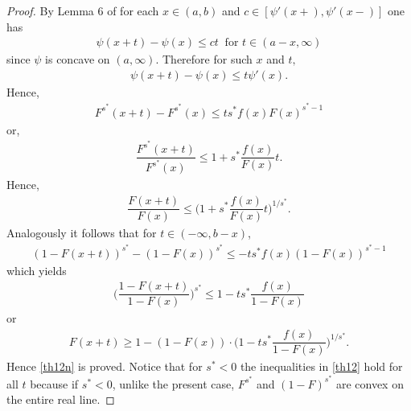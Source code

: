 \documentclass[11pt]{amsart}
\numberwithin{equation}{section}
\def\st{\ensuremath{s^*}}
\theoremstyle{definition}\newtheorem{definition}{Definition}
\theoremstyle{remark}\newtheorem{assumption}{Assumption}
\theoremstyle{remark}\newtheorem{remark}{Remark}
\theoremstyle{definition}\newtheorem{example}{Example}
\theoremstyle{plain}\newtheorem{question}{Question}
\theoremstyle{plain}\newtheorem{theorem}{Theorem}
\theoremstyle{plain}\newtheorem{lemma}{Lemma}
\theoremstyle{plain}\newtheorem{proposition}{Proposition}
\theoremstyle{plain}\newtheorem{corollary}{Corollary}
\theoremstyle{plain}\newtheorem{conjecture}{Conjecture}
\begin{document}
\begin{proof}
By Lemma 6 of \cite{DuembgenKW:2017} for each $x\in(a,b)$ and $c\in[\psi'(x+),\psi'(x-)]$ one has
 \begin{eqnarray*}
    \psi(x+t) -\psi(x)\leq ct\ \text{ for }t\in(a-x,\infty)
 \end{eqnarray*}
 since $\psi$ is concave on $(a,\infty).$
    Therefore for such $x$ and $t,$
 \begin{eqnarray*}
     \psi(x+t)-\psi(x)\leq t \psi'(x).
 \end{eqnarray*} 
    Hence, 
 \begin{eqnarray*}
    F^{s^*}(x+t)-F^{s^*}(x)\leq ts^{*}f(x)F(x)^{s^*-1} 
 \end{eqnarray*}
    or, 
 \begin{eqnarray*}
    \dfrac{F^{s^*}(x+t)}{F^{s^*}(x)}\leq 1+s^*\dfrac{f(x)}{F(x)}t .
 \end{eqnarray*}
    Hence,
\begin{eqnarray*}
   \dfrac{F(x+t)}{F(x)}\leq\bigg ( 1+s^*\dfrac{f(x)}{F(x)}t\bigg )^{1/s^*}.
\end{eqnarray*}
     Analogously it follows that for $t\in(-\infty,b-x)$,
\begin{eqnarray*}
(1-F(x+t))^{s^*}-(1-F(x))^{s^*} \leq -ts^*f(x)(1-F(x))^{s^*-1}
\end{eqnarray*} 
   which yields
\begin{eqnarray*}   
  \bigg(\dfrac{1-F(x+t)}{1-F(x)}\bigg )^{s^*}\leq 1-ts^*\dfrac{f(x)}{1-F(x)}
\end{eqnarray*}
    or
 \begin{eqnarray*}
 F(x+t)\geq 1-(1-F(x))\cdot \bigg (1-ts^*\dfrac{f(x)}{1-F(x)}\bigg)^{1/s^*}.
 \end{eqnarray*}
    Hence \eqref{th12n} is proved. Notice that for $\st< 0$ the inequalities in \eqref{th12} 
    hold for all $t$ because if $\st<0$, unlike the present case, 
    $F^{\st}$ and $(1-F)^{\st}$ are convex on the entire real line.
  

\end{proof}
\end{document}
